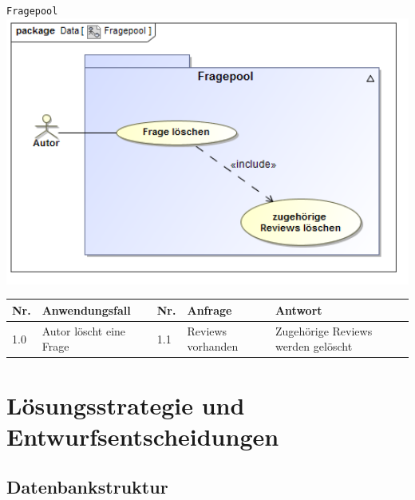 \documentclass[a4paper]{scrreprt}
\begin{document}
\newpage
\texttt{Fragepool}\\

\includegraphics[width=1.0\textwidth]{Use_Case_Diagram__Fragepool.png}
\label{Fragepool bearbeiten}

\begin{tabular}{|p{0.5cm}|p{3cm}|p{0.5cm}|p{4cm}|p{4.5cm}|}\hline
Nr. & Anwendungsfall & Nr. & Anfrage & Antwort\\\hline
1.0 & Autor löscht eine Frage & 1.1 & Reviews vorhanden & Zugehörige Reviews werden gelöscht\\\hline
\end{tabular}


\chapter{Lösungsstrategie und Entwurfsentscheidungen}
\section{Datenbankstruktur}
\end{document}
